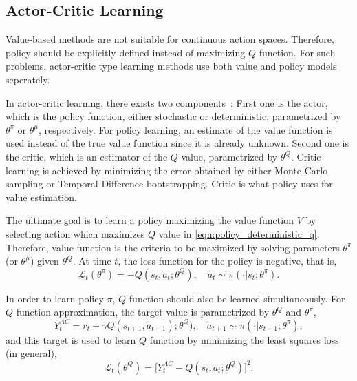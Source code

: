 \subsection{Actor-Critic Learning}

Value-based methods are not suitable for continuous action spaces. 
Therefore, policy should be explicitly defined instead of maximizing $Q$ function. 
For such problems, actor-critic type learning methods use both value and policy models seperately. 

In actor-critic learning, there exists two components~\cite{silver_deterministic_2014}:  
First one is the actor, which is the policy function, either stochastic or deterministic, parametrized by $\theta^{\pi}$ or $\theta^{\mu}$, respectively. 
For policy learning, an estimate of the value function is used instead of the true value function since it is already unknown. 
Second one is the critic, which is an estimator of the $Q$ value, parametrized by $\theta^Q$. 
Critic learning is achieved by minimizing the error obtained by either Monte Carlo sampling or Temporal Difference bootstrapping.
Critic is what policy uses for value estimation. 

The ultimate goal is to learn a policy maximizing the value function $V$ by selecting action which maximizes $Q$ value in \eqref{eqn:policy_deterministic_q}. 
Therefore, value function is the criteria to be maximized by solving parameters $\theta^\pi$ (or $\theta^\mu$) given $\theta^Q$. 
At time $t$, the loss function for the policy is negative, that is,  
\begin{equation}
\label{eqn:ac_value_maximization}
\mathcal{L}_t(\theta^\pi) = - Q(s_t, \widetilde{a}_t;\theta^Q), \quad \widetilde{a}_t \sim \pi(\cdot|s_t;\theta^\pi).
\end{equation}

In order to learn policy $\pi$, $Q$ function should also be learned simultaneously. 
For $Q$ function approximation, the target value is parametrized by $\theta^Q$ and $\theta^\pi$,
\begin{equation}
\label{eqn:ac_target}
Y_t^{AC} = r_t + \gamma Q(s_{t+1}, \widetilde{a}_{t+1});\theta^Q), \quad \widetilde{a}_{t+1} \sim \pi(\cdot|s_{t+1};\theta^{\pi}),
\end{equation}
and this target is used to learn $Q$ function by minimizing the least squares loss (in general),
\begin{equation}
\label{eqn:ac_loss}
\mathcal{L}_t(\theta^Q) = \big[ Y_t^{AC} - Q(s_t,a_t;\theta^Q) \big] ^ 2.
\end{equation}

